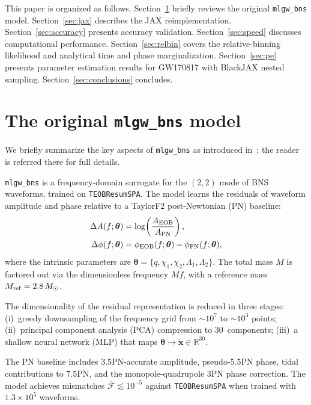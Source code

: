 \documentclass[twocolumn,superscriptaddress,nofootinbib,aps,prd]{revtex4-2}
\begin{document}
This paper is organized as follows.  Section~\ref{sec:original} briefly
reviews the original \texttt{mlgw\_bns} model.  Section~\ref{sec:jax}
describes the JAX reimplementation.  Section~\ref{sec:accuracy} presents
accuracy validation.  Section~\ref{sec:speed} discusses computational
performance.  Section~\ref{sec:relbin} covers the relative-binning likelihood
and analytical time and phase marginalization.  Section~\ref{sec:pe} presents
parameter estimation results for GW170817 with BlackJAX nested sampling.
Section~\ref{sec:conclusions} concludes.


\section{The original \texttt{mlgw\_bns} model}
\label{sec:original}

We briefly summarize the key aspects of \texttt{mlgw\_bns} as introduced
in~\cite{Tissino:2022}; the reader is referred there for full details.

\texttt{mlgw\_bns} is a frequency-domain surrogate for the $(2,2)$ mode of
BNS waveforms, trained on \texttt{TEOBResumSPA}.  The model learns the
residuals of waveform amplitude and phase relative to a TaylorF2
post-Newtonian (PN) baseline:
\begin{align}
    \Delta A(f;\bm{\theta}) &= \log\!\left(\frac{A_{\rm EOB}}{A_{\rm PN}}\right), \label{eq:resA}\\
    \Delta\phi(f;\bm{\theta}) &= \phi_{\rm EOB}(f;\bm{\theta}) - \phi_{\rm PN}(f;\bm{\theta}), \label{eq:resphi}
\end{align}
where the intrinsic parameters are $\bm{\theta} = \{q, \chi_1, \chi_2,
\Lambda_1, \Lambda_2\}$.  The total mass $M$ is factored out via the
dimensionless frequency $Mf$, with a reference mass $M_{\rm ref} = 2.8\,
M_\odot$.

The dimensionality of the residual representation is reduced in three stages:
(i)~greedy downsampling of the frequency grid from $\sim\!10^7$ to
$\sim\!10^3$ points; (ii)~principal component analysis (PCA) compression to
30~components; (iii)~a shallow neural network (MLP) that maps
$\bm{\theta} \to \tilde{\bm{x}} \in \mathbb{R}^{30}$.

The PN baseline includes 3.5PN-accurate amplitude, pseudo-5.5PN phase, tidal
contributions to 7.5PN, and the monopole-quadrupole 3PN phase correction.
The model achieves mismatches $\bar{\mathcal{F}} \lesssim 10^{-5}$ against
\texttt{TEOBResumSPA} when trained with $1.3\times10^5$ waveforms.
\end{document}
